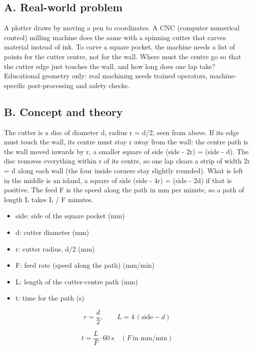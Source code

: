 \documentclass[11pt,a4paper]{article}
\begin{document}
\subsection*{A. Real-world problem}
A plotter draws by moving a pen to coordinates. A CNC (computer numerical control) milling machine does the same with a spinning cutter that carves material instead of ink. To carve a square pocket, the machine needs a list of points for the cutter centre, not for the wall. Where must the centre go so that the cutter edge just touches the wall, and how long does one lap take? Educational geometry only: real machining needs trained operators, machine-specific post-processing and safety checks.

\subsection*{B. Concept and theory}
The cutter is a disc of diameter d, radius r = d/2, seen from above. If its edge must touch the wall, its centre must stay r away from the wall: the centre path is the wall moved inwards by r, a smaller square of side (side - 2r) = (side - d). The disc removes everything within r of its centre, so one lap clears a strip of width 2r = d along each wall (the four inside corners stay slightly rounded). What is left in the middle is an island, a square of side (side - 4r) = (side - 2d) if that is positive. The feed F is the speed along the path in mm per minute, so a path of length L takes L / F minutes.

\begin{itemize}[nosep]
\item side: side of the square pocket (mm)
\item d: cutter diameter (mm)
\item r: cutter radius, d/2 (mm)
\item F: feed rate (speed along the path) (mm/min)
\item L: length of the cutter-centre path (mm)
\item t: time for the path (s)
\end{itemize}

\begin{equation*}
r=\frac d2,\qquad L=4\,(\text{side}-d)
\end{equation*}

\begin{equation*}
t=\frac{L}{F}\cdot 60\ \text{s}\quad(F\ \text{in mm/min})
\end{equation*}
\end{document}
